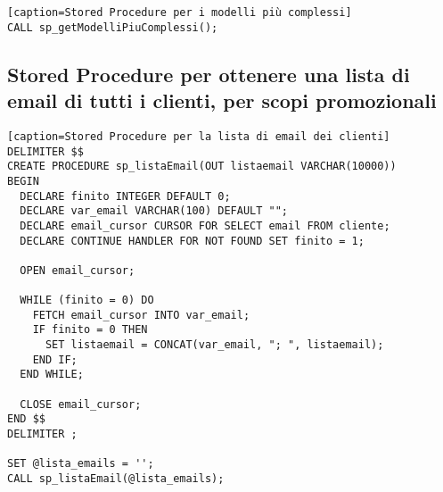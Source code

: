 \documentclass[a4paper,11pt]{article}
\begin{document}
{\begin{lstlisting}[style=SQL][caption=Stored Procedure per i modelli più complessi]
CALL sp_getModelliPiuComplessi();
\end{lstlisting}

\subsection{Stored Procedure per ottenere una lista di email di tutti i clienti, per scopi promozionali}

\begin{lstlisting}[style=SQL][caption=Stored Procedure per la lista di email dei clienti]
DELIMITER $$
CREATE PROCEDURE sp_listaEmail(OUT listaemail VARCHAR(10000))
BEGIN
  DECLARE finito INTEGER DEFAULT 0;
  DECLARE var_email VARCHAR(100) DEFAULT "";
  DECLARE email_cursor CURSOR FOR SELECT email FROM cliente;
  DECLARE CONTINUE HANDLER FOR NOT FOUND SET finito = 1;
  
  OPEN email_cursor;
  
  WHILE (finito = 0) DO
    FETCH email_cursor INTO var_email;
    IF finito = 0 THEN
      SET listaemail = CONCAT(var_email, "; ", listaemail);
    END IF;
  END WHILE;
  
  CLOSE email_cursor;
END $$
DELIMITER ;

SET @lista_emails = '';
CALL sp_listaEmail(@lista_emails);

\end{lstlisting}
}
\end{document}
